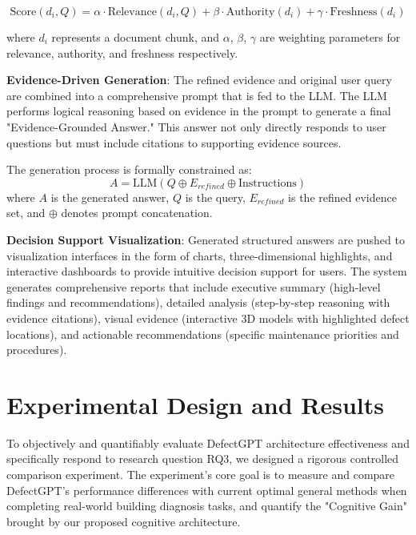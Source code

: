 \begin{equation}
\text{Score}(d_i, Q) = \alpha \cdot \text{Relevance}(d_i, Q) + \beta \cdot \text{Authority}(d_i) + \gamma \cdot \text{Freshness}(d_i)
\end{equation}

where $d_i$ represents a document chunk, and $\alpha$, $\beta$, $\gamma$ are weighting parameters for relevance, authority, and freshness respectively.

\textbf{Evidence-Driven Generation}: The refined evidence and original user query are combined into a comprehensive prompt that is fed to the LLM. The LLM performs logical reasoning based on evidence in the prompt to generate a final "Evidence-Grounded Answer." This answer not only directly responds to user questions but must include citations to supporting evidence sources.

The generation process is formally constrained as:
\begin{equation}
A = \text{LLM}(Q \oplus E_{refined} \oplus \text{Instructions})
\end{equation}
where $A$ is the generated answer, $Q$ is the query, $E_{refined}$ is the refined evidence set, and $\oplus$ denotes prompt concatenation.

\textbf{Decision Support Visualization}: Generated structured answers are pushed to visualization interfaces in the form of charts, three-dimensional highlights, and interactive dashboards to provide intuitive decision support for users. The system generates comprehensive reports that include executive summary (high-level findings and recommendations), detailed analysis (step-by-step reasoning with evidence citations), visual evidence (interactive 3D models with highlighted defect locations), and actionable recommendations (specific maintenance priorities and procedures).

\section{Experimental Design and Results}

To objectively and quantifiably evaluate DefectGPT architecture effectiveness and specifically respond to research question RQ3, we designed a rigorous controlled comparison experiment. The experiment's core goal is to measure and compare DefectGPT's performance differences with current optimal general methods when completing real-world building diagnosis tasks, and quantify the "Cognitive Gain" brought by our proposed cognitive architecture.

